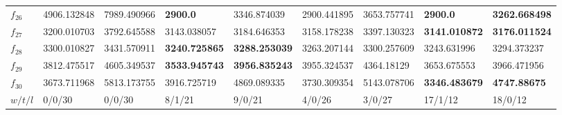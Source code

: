 \begin{table*}[h!]
\begin{tabular}{|p{0.8cm}|p{1.6cm}|p{1.6cm}|p{1.6cm}|p{1.6cm}|p{1.6cm}|p{1.6cm}|p{1.6cm}|p{1.6cm}|}
$f_{26}$  & 4906.132848 & 7989.490966 & \textbf{2900.0} & 3346.874039 & 2900.441895 & 3653.757741 & \textbf{2900.0} & \textbf{3262.668498} \\ 
$f_{27}$  & 3200.010703 & 3792.645588 & 3143.038057 & 3184.646353 & 3158.178238 & 3397.130323 & \textbf{3141.010872} & \textbf{3176.011524} \\ 
$f_{28}$  & 3300.010827 & 3431.570911 & \textbf{3240.725865} & \textbf{3288.253039} & 3263.207144 & 3300.257609 & 3243.631996 & 3294.373237 \\ 
$f_{29}$  & 3812.475517 & 4605.349537 & \textbf{3533.945743} & \textbf{3956.835243} & 3955.324537 & 4364.18129 & 3653.675553 & 3966.471956 \\ 
$f_{30}$  & 3673.711968 & 5813.173755 & 3916.725719 & 4869.089335 & 3730.309354 & 5143.078706 & \textbf{3346.483679} & \textbf{4747.88675} \\ 
\hline
$w/t/l$  & 0/0/30 & 0/0/30 & 8/1/21 & 9/0/21 & 4/0/26 & 3/0/27 & 17/1/12 & 18/0/12 \\
\hline
\end{tabular}
\end{table*}

